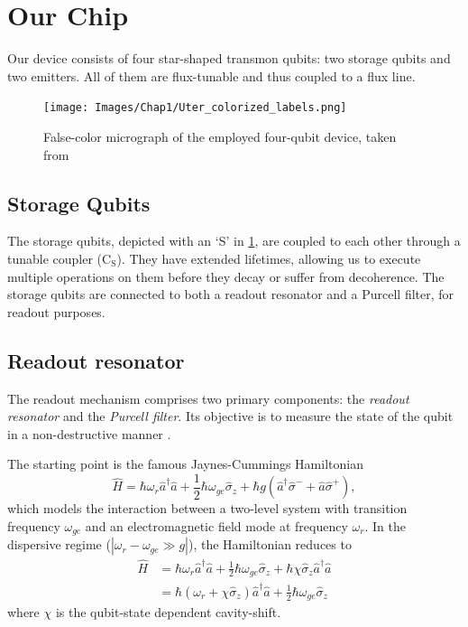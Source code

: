 \section{Our Chip}
\label{sec:our_setup}

Our device consists of four star-shaped transmon qubits: two storage qubits and two emitters.
All of them are flux-tunable and thus coupled to a flux line.

\begin{figure}
    \centering
    \texttt{[image: Images/Chap1/Uter\_colorized\_labels.png]}
    \caption{False-color micrograph of the employed four-qubit device, taken from \cite{HernandezAnton2023}}
    \label{fig:our_chip}
\end{figure}

\subsection{Storage Qubits}
The storage qubits, depicted with an ‘S' in \cref{fig:our_chip}, are coupled to each other through a tunable coupler ($\text{C}_\text{S}$).
They have extended lifetimes, allowing us to execute multiple operations on them before they decay or suffer from decoherence.
The storage qubits are connected to both a readout resonator and a Purcell filter, for readout purposes.

\subsection{Readout resonator}

The readout mechanism comprises two primary components: the \emph{readout resonator} and the \emph{Purcell filter}. 
Its objective is to measure the state of the qubit in a non-destructive manner \cite{singleshot_readout}.

The starting point is the famous Jaynes-Cummings Hamiltonian \cite{haroche2006exploring}
\begin{equation}
    \hat{H} = \hbar \omega_r \hat{a}^\dagger \hat{a} + \frac{1}{2} \hbar \omega_{ge} \hat{\sigma}_z + \hbar g (\hat{a}^\dagger \hat{\sigma}^- + \hat{a} \hat{\sigma}^+) ,
\end{equation}
which models the interaction between a two-level system with transition frequency $\omega_{ge}$ and an electromagnetic field mode at frequency $\omega_r$.
In the dispersive regime ($|\omega_r - \omega_{ge} \gg g|$), the Hamiltonian reduces to \cite{transmon_regime}
\begin{align}
    \hat{H} &= \hbar \omega_r \hat{a}^\dagger \hat{a} + \frac{1}{2} \hbar \omega_{ge} \hat{\sigma}_z + \hbar \chi \hat{\sigma}_z \hat{a}^\dagger \hat{a} \\
    &= \hbar (\omega_r + \chi \hat{\sigma}_z ) \hat{a}^\dagger \hat{a} +
    \frac{1}{2} \hbar \omega_{ge} \hat{\sigma}_z 
\end{align}
where $\chi$ is the qubit-state dependent cavity-shift.

